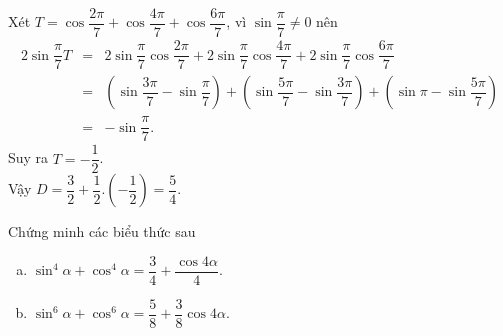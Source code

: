 \begin{bt}
{\begin{enumerate}
Xét $T=\cos \dfrac{2\pi }{7}+\cos \dfrac{4\pi }{7}+\cos \dfrac{6\pi }{7}$, vì $\sin \dfrac{\pi }{7}\ne 0$ nên
\begin{eqnarray*}
2\sin \dfrac{\pi }{7}T&=&2\sin \dfrac{\pi }{7}\cos \dfrac{2\pi }{7}+2\sin \dfrac{\pi }{7}\cos \dfrac{4\pi }{7}+2\sin \dfrac{\pi }{7}\cos \dfrac{6\pi }{7} \\ 
&=&( \sin \dfrac{3\pi }{7}-\sin \dfrac{\pi }{7} )+( \sin \dfrac{5\pi }{7}-\sin \dfrac{3\pi }{7} )+( \sin \pi -\sin \dfrac{5\pi }{7} ) \\ 
&=&-\sin \dfrac{\pi }{7}.
\end{eqnarray*}
Suy ra $T=-\dfrac{1}{2}$.\\
Vậy $D=\dfrac{3}{2}+\dfrac{1}{2}.( -\dfrac{1}{2} )=\dfrac{5}{4}$.
\end{enumerate}
}
\end{bt}

\begin{bt}%
	Chứng minh các biểu thức sau
	\begin{enumerate}[a)]
		\item $\sin ^4 \alpha+\cos ^4 \alpha=\dfrac{3}{4}+\dfrac{\cos 4 \alpha}{4}.$
		\item $\sin ^6 \alpha+\cos ^6 \alpha=\dfrac{5}{8}+\dfrac{3}{8} \cos 4 \alpha.$
	\end{enumerate}
\end{bt}

